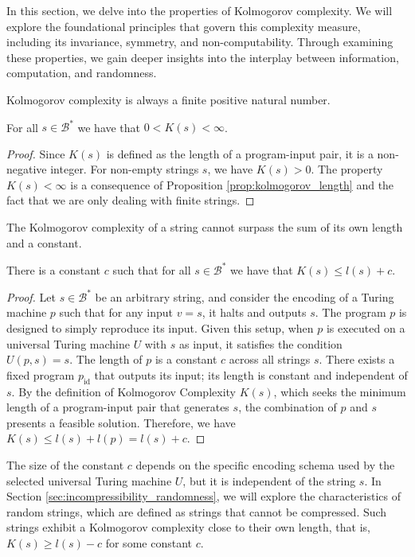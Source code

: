In this section, we delve into the properties of Kolmogorov complexity. We will explore the foundational principles that govern this complexity measure, including its invariance, symmetry, and non-computability. Through examining these properties, we gain deeper insights into the interplay between information, computation, and randomness.

Kolmogorov complexity is always a finite positive natural number.

\begin{proposition}
For all $s\in\mathcal{B}^{\ast}$ we have that $0 < K(s) < \infty$.
\end{proposition}
\begin{proof}
Since $K(s)$ is defined as the length of a program-input pair, it is a non-negative integer. For non-empty strings $s$, we have $K(s) > 0$. The property $K(s) < \infty$ is a consequence of Proposition \ref{prop:kolmogorov_length} and the fact that we are only dealing with finite strings.
\end{proof}

The Kolmogorov complexity of a string cannot surpass the sum of its own length and a constant.

\begin{proposition}
\label{prop:kolmogorov_length}
There is a constant $c$ such that for all $s\in\mathcal{B}^{\ast}$ we have that $K(s) \leq l(s) + c$.
\end{proposition}
\begin{proof}
Let $s \in \mathcal{B}^\ast$ be an arbitrary string, and consider the encoding of a Turing machine $p$ such that for any input $v = s$, it halts and outputs $s$. The program $p$ is designed to simply reproduce its input. Given this setup, when $p$ is executed on a universal Turing machine $U$ with $s$ as input, it satisfies the condition $U(p, s) = s$. The length of \(p\) is a constant $c$ across all strings $s$. There exists a fixed program $p_{\text{id}}$ that outputs its input; its length is constant and independent of $s$. By the definition of Kolmogorov Complexity $K(s)$, which seeks the minimum length of a program-input pair that generates $s$, the combination of $p$ and $s$ presents a feasible solution. Therefore, we have $K(s) \leq l(s) + l(p) = l(s) + c$.
\end{proof}

The size of the constant $c$ depends on the specific encoding schema used by the selected universal Turing machine $U$, but it is independent of the string $s$. In Section \ref{sec:incompressibility_randomness}, we will explore the characteristics of random strings, which are defined as strings that cannot be compressed. Such strings exhibit a Kolmogorov complexity close to their own length, that is, $K(s) \ge l(s) - c$ for some constant $c$.

